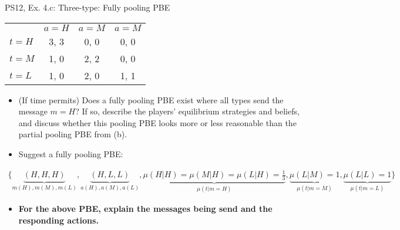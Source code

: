 \begin{frame}{PS12, Ex. 4.c: Three-type: Fully pooling PBE}
    \begin{table}
      \begin{tabular}{l|c|c|c|}
          \multicolumn{1}{c}{} & \multicolumn{1}{c}{$a=H$} & \multicolumn{1}{c}{$a=M$} & \multicolumn{1}{c}{$a=M$} \\\cline{2-4}
          $t=H$ & 3, 3 & 0, 0 & 0, 0 \\\cline{2-4}
          $t=M$ & 1, 0 & 2, 2 & 0, 0 \\\cline{2-4}
          $t=L$ & 1, 0 & 2, 0 & 1, 1 \\\cline{2-4}
      \end{tabular}
    \end{table}\vspace{-8pt}
    \begin{itemize}
      \item[(c)] (If time permits) Does a fully pooling PBE exist where all types send the message $m = H$? If so, describe the players’ equilibrium strategies and beliefs, and discuss whether this pooling PBE looks more or less reasonable than the partial pooling PBE from (b).
      \item[Step 1:] Suggest a fully pooling PBE:
    \end{itemize}\vspace{-12pt}
    \begin{align*}
      \{\underbrace{(H,H,H)}_{m(H),m(M),m(L)},\underbrace{(H,L,L)}_{a(H),a(M),a(L)},\underbrace{\mu(H|H)=\mu(M|H)=\mu(L|H)=\frac{1}{3}}_{\mu(t|m=H)},\underbrace{\mu(L|M)=1}_{\mu(t|m=M)},\underbrace{\mu(L|L)=1}_{\mu(t|m=L)}\}
    \end{align*}\vspace{-14pt}
    \begin{itemize}
        \item[Step 2:] \textbf{For the above PBE, explain the messages being send and the responding actions.}
    \end{itemize}\vspace{-2pt}
\end{frame}
